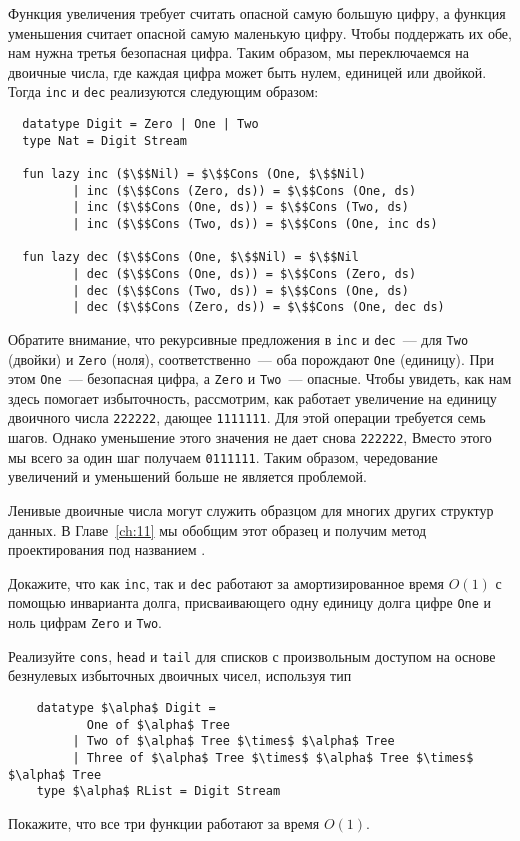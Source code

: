Функция увеличения требует считать опасной самую большую цифру, а
функция уменьшения считает опасной самую маленькую цифру. Чтобы
поддержать их обе, нам нужна третья безопасная цифра. Таким образом,
мы переключаемся на  двоичные числа, где
каждая цифра может быть нулем, единицей или двойкой. Тогда
\lstinline!inc! и \lstinline!dec! реализуются следующим образом:
\begin{lstlisting}
  datatype Digit = Zero | One | Two
  type Nat = Digit Stream
  
  fun lazy inc ($\$$Nil) = $\$$Cons (One, $\$$Nil)
         | inc ($\$$Cons (Zero, ds)) = $\$$Cons (One, ds)
         | inc ($\$$Cons (One, ds)) = $\$$Cons (Two, ds)
         | inc ($\$$Cons (Two, ds)) = $\$$Cons (One, inc ds)

  fun lazy dec ($\$$Cons (One, $\$$Nil) = $\$$Nil
         | dec ($\$$Cons (One, ds)) = $\$$Cons (Zero, ds)
         | dec ($\$$Cons (Two, ds)) = $\$$Cons (One, ds)
         | dec ($\$$Cons (Zero, ds)) = $\$$Cons (One, dec ds)
\end{lstlisting}
Обратите внимание, что рекурсивные предложения в \lstinline!inc! и
\lstinline!dec!~--- для \lstinline!Two! (двойки) и \lstinline!Zero! (ноля),
соответственно~--- оба порождают \lstinline!One! (единицу). При этом
\lstinline!One!~--- безопасная цифра, а \lstinline!Zero! и
\lstinline!Two!~--- опасные. Чтобы увидеть, как нам здесь помогает
избыточность, рассмотрим, как работает увеличение на единицу двоичного
числа \texttt{222222}, дающее \texttt{1111111}. Для этой операции
требуется семь шагов. Однако уменьшение этого значения не дает снова
\texttt{222222}, Вместо этого мы всего за один шаг получаем
\texttt{0111111}. Таким образом, чередование увеличений и уменьшений
больше не является проблемой.

Ленивые двоичные числа могут служить образцом для многих других
структур данных. В Главе~\ref{ch:11} мы обобщим этот образец и получим
метод проектирования под названием .

\begin{exercise}\label{ex:9.8}
  Докажите, что как \lstinline!inc!, так и \lstinline!dec! работают за
  амортизированное время $O(1)$ с помощью инварианта долга,
  присваивающего одну единицу долга цифре \lstinline!One! и ноль цифрам
  \lstinline!Zero! и \lstinline!Two!.
\end{exercise}

\begin{exercise}\label{ex:9.9}
  Реализуйте \lstinline!cons!, \lstinline!head! и \lstinline!tail! для
  списков с произвольным доступом на основе безнулевых избыточных
  двоичных чисел, используя тип
  \begin{lstlisting}
    datatype $\alpha$ Digit =
           One of $\alpha$ Tree
         | Two of $\alpha$ Tree $\times$ $\alpha$ Tree
         | Three of $\alpha$ Tree $\times$ $\alpha$ Tree $\times$ $\alpha$ Tree
    type $\alpha$ RList = Digit Stream
  \end{lstlisting}
  Покажите, что все три функции работают за время $O(1)$.
\end{exercise}

